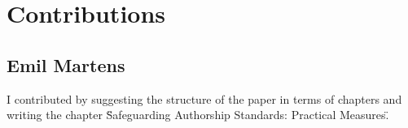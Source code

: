 \section*{Contributions}
\subsection*{Emil Martens}
I contributed by suggesting the structure of the paper in terms of chapters and writing the chapter \"Safeguarding Authorship Standards: Practical Measures\".
